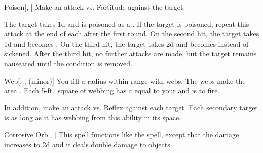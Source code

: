 \lowercase{\hypertarget{spell:Poison}{}}\label{spell:Poison}
\begin{freeability}[Rank 3]{\hypertarget{spell:Poison}{Poison}}[, ]
Make an attack vs. Fortitude against the target.

\hit The target takes  \minus1d and is poisoned as a .
If the target is poisoned, repeat this attack at the end of each  after the first round.
On the second hit, the target takes  \minus1d and becomes .
On the third hit, the target takes  \plus2d and becomes  instead of sickened.
After the third hit, no further attacks are made, but the target remains nauseated until the condition is removed.
\end{freeability}
\vspace{0.25em}



\lowercase{\hypertarget{spell:Web}{}}\label{spell:Web}
\begin{freeability}[Rank 3]{\hypertarget{spell:Web}{Web}}[, ,  (minor)]
You fill a \areasmall radius  within \rngclose range with webs.
The webs make the area .
Each 5-ft.\ square of webbing has a  equal to your  and is  to fire.

In addition, make an attack vs. Reflex against each target.
\hit Each secondary target is  as long as it has webbing from this ability in its space.
\end{freeability}
\vspace{0.25em}



\lowercase{\hypertarget{spell:Corrosive Orb}{}}\label{spell:Corrosive Orb}
\begin{freeability}[Rank 4]{\hypertarget{spell:Corrosive Orb}{Corrosive Orb}}[, ]
This spell functions like the  spell, except that the damage increases to  \plus2d and it deals double damage to objects.
\end{freeability}
\vspace{0.25em}



